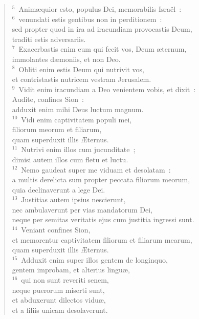 \begin{verse}${}^{5}$~Anim\ae quior esto, populus Dei, memorabilis Isra\"el~:\\
${}^{6}$~venundati estis gentibus non in perditionem~:\\ sed propter quod in ira ad iracundiam provocastis Deum,\\ traditi estis adversariis.\\
${}^{7}$~Exacerbastis enim eum qui fecit vos, Deum \ae ternum,\\ immolantes d\ae moniis, et non Deo.\\
${}^{8}$~Obliti enim estis Deum qui nutrivit vos,\\ et contristastis nutricem vestram Jerusalem.\\
${}^{9}$~Vidit enim iracundiam a Deo venientem vobis, et dixit~:\\ Audite, confines Sion~:\\ adduxit enim mihi Deus luctum magnum.\\
${}^{10}$~Vidi enim captivitatem populi mei,\\ filiorum meorum et filiarum,\\ quam superduxit illis \AE ternus.\\
${}^{11}$~Nutrivi enim illos cum jucunditate~;\\ dimisi autem illos cum fletu et luctu.\\
${}^{12}$~Nemo gaudeat super me viduam et desolatam~:\\ a multis derelicta sum propter peccata filiorum meorum,\\ quia declinaverunt a lege Dei.\\
${}^{13}$~Justitias autem ipsius nescierunt,\\ nec ambulaverunt per vias mandatorum Dei,\\ neque per semitas veritatis ejus cum justitia ingressi sunt.\\
${}^{14}$~Veniant confines Sion,\\ et memorentur captivitatem filiorum et filiarum mearum,\\ quam superduxit illis \AE ternus.\\
${}^{15}$~Adduxit enim super illos gentem de longinquo,\\ gentem improbam, et alterius lingu\ae ,\\
${}^{16}$~qui non sunt reveriti senem,\\ neque puerorum miserti sunt,\\ et abduxerunt dilectos vidu\ae ,\\ et a filiis unicam desolaverunt.\\

\end{verse}
